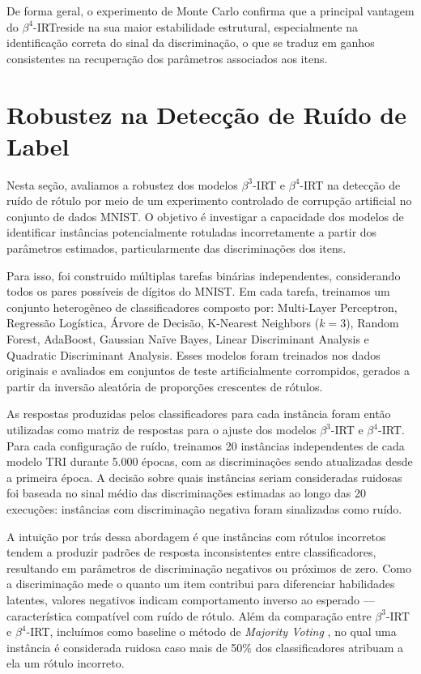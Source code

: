 De forma geral, o experimento de Monte Carlo confirma que a principal vantagem do $\beta^{4}$-\gls{IRT}reside na sua maior estabilidade estrutural, especialmente na identificação correta do sinal da discriminação, o que se traduz em ganhos consistentes na recuperação dos parâmetros associados aos itens.

\section{Robustez na Detecção de Ruído de Label}

Nesta seção, avaliamos a robustez dos modelos $\beta^{3}$-\gls{IRT} e $\beta^{4}$-\gls{IRT} na detecção de ruído de rótulo por meio de um experimento controlado de corrupção artificial no conjunto de dados MNIST. O objetivo é investigar a capacidade dos modelos de identificar instâncias potencialmente rotuladas incorretamente a partir dos parâmetros estimados, particularmente das discriminações dos itens.

Para isso, foi construido múltiplas tarefas binárias independentes, considerando todos os pares possíveis de dígitos do MNIST. Em cada tarefa, treinamos um conjunto heterogêneo de classificadores composto por: Multi-Layer Perceptron, Regressão Logística, Árvore de Decisão, K-Nearest Neighbors ($k = 3$), Random Forest, AdaBoost, Gaussian Naïve Bayes, Linear Discriminant Analysis e Quadratic Discriminant Analysis. Esses modelos foram treinados nos dados originais e avaliados em conjuntos de teste artificialmente corrompidos, gerados a partir da inversão aleatória de proporções crescentes de rótulos.

As respostas produzidas pelos classificadores para cada instância foram então utilizadas como matriz de respostas para o ajuste dos modelos $\beta^{3}$-\gls{IRT} e $\beta^{4}$-\gls{IRT}. Para cada configuração de ruído, treinamos 20 instâncias independentes de cada modelo \gls{TRI} durante 5.000 épocas, com as discriminações sendo atualizadas desde a primeira época. A decisão sobre quais instâncias seriam consideradas ruidosas foi baseada no sinal médio das discriminações estimadas ao longo das 20 execuções: instâncias com discriminação negativa foram sinalizadas como ruído.

A intuição por trás dessa abordagem é que instâncias com rótulos incorretos tendem a produzir padrões de resposta inconsistentes entre classificadores, resultando em parâmetros de discriminação negativos ou próximos de zero. Como a discriminação mede o quanto um item contribui para diferenciar habilidades latentes, valores negativos indicam comportamento inverso ao esperado — característica compatível com ruído de rótulo. Além da comparação entre $\beta^{3}$-\gls{IRT} e $\beta^{4}$-\gls{IRT}, incluímos como baseline o método de \textit{Majority Voting} \cite{sluban2015relating}, no qual uma instância é considerada ruidosa caso mais de 50\% dos classificadores atribuam a ela um rótulo incorreto.

